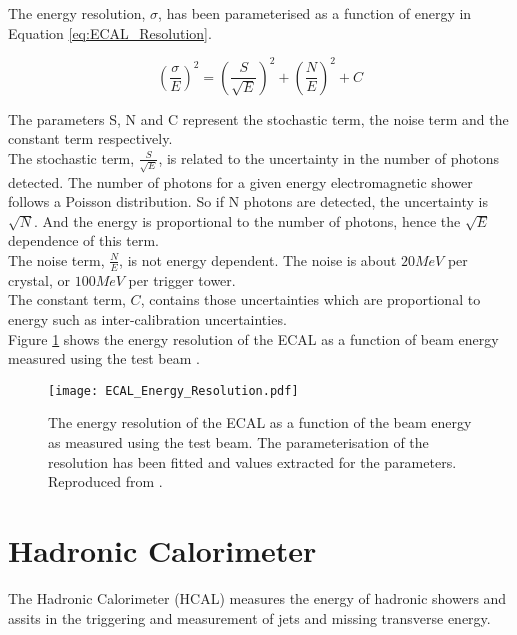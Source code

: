 The energy resolution, $\sigma$, has been parameterised as a function of energy 
in Equation \ref{eq:ECAL_Resolution}. 

\begin{equation}
\left( \frac{\sigma}{E} \right)^{2} = \left( \frac{S}{\sqrt{E}} \right)^{2} +
\left( \frac{N}{E} \right)^{2} + C
\label{eq:ECAL_Resolution}
\end{equation}

The parameters S, N and C represent the stochastic term, the noise term and the
constant term respectively. \\

The stochastic term, $\frac{S}{\sqrt{E}}$, is related to the uncertainty in the 
number of photons detected. The number of photons for a given energy 
electromagnetic shower follows a Poisson distribution. So if N photons are 
detected, the uncertainty is $\sqrt{N}$. And the energy is proportional to the 
number of photons, hence the $\sqrt{E}$ dependence of this term. \\

The noise term, $\frac{N}{E}$, is not energy dependent. The noise is about $20
\unit{MeV}$ per crystal, or $100\unit{MeV}$ per trigger tower. \\

The constant term, $C$, contains those uncertainties which are proportional to
energy such as inter-calibration uncertainties. \\

Figure \ref{fig:ECAL_Energy_Resolution} shows the energy resolution of the ECAL
as a function of beam energy measured using the test beam \cite{test_beam}.

\begin{figure}
\begin{center}
\texttt{[image: ECAL\_Energy\_Resolution.pdf]}
\end{center}
\caption{The energy resolution of the ECAL as a function of the beam energy as
measured using the test beam. The parameterisation of the resolution has been 
fitted and values extracted for the parameters. Reproduced from
\cite{test_beam}.}
\label{fig:ECAL_Energy_Resolution}
\end{figure}

\section{Hadronic Calorimeter}

The Hadronic Calorimeter (HCAL) measures the energy of hadronic showers and
assits in the triggering and measurement of jets and missing transverse energy.
\\

